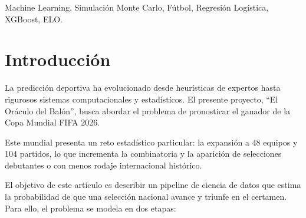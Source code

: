 \documentclass[conference]{IEEEtran}
\begin{document}
	
	\maketitle
	
	\begin{abstract}
		La predicción de resultados en torneos internacionales de fútbol es un desafío complejo debido a la alta varianza y la naturaleza de baja anotación del deporte. Este artículo presenta un enfoque fundamentado en Machine Learning para predecir las probabilidades de resultados a nivel de partido y simular la Copa Mundial de la FIFA 2026 bajo su nuevo formato de 48 equipos.
		
		Mediante el uso de datos históricos de partidos, rankings ELO y valor de mercado, se entrenaron modelos como Regresión Logística y XGBoost. Los resultados muestran que un modelo lineal estandarizado obtiene una mejor calibración probabilística. Usando el mejor modelo, se ejecutaron 100,000 simulaciones de Monte Carlo del torneo completo, estableciendo a España, Francia y Argentina como los principales favoritos.
	\end{abstract}
	
	\begin{IEEEkeywords}
		Machine Learning, Simulación Monte Carlo, Fútbol, Regresión Logística, XGBoost, ELO.
	\end{IEEEkeywords}
	
	\section{Introducción}
	
	La predicción deportiva ha evolucionado desde heurísticas de expertos hasta rigurosos sistemas computacionales y estadísticos. El presente proyecto, ``El Oráculo del Balón'', busca abordar el problema de pronosticar el ganador de la Copa Mundial FIFA 2026.
	
	Este mundial presenta un reto estadístico particular: la expansión a 48 equipos y 104 partidos, lo que incrementa la combinatoria y la aparición de selecciones debutantes o con menos rodaje internacional histórico.
	
	El objetivo de este artículo es describir un pipeline de ciencia de datos que estima la probabilidad de que una selección nacional avance y triunfe en el certamen. Para ello, el problema se modela en dos etapas:
	
\end{document}
